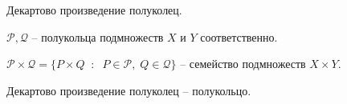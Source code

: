 
\begin{definition}\thmslashn
	
	Декартово произведение полуколец.
	
	$\mathcal{P}, \mathcal{Q}$ -- полукольца подмножеств $X$ и $Y$ соответственно.
	
	
	$\mathcal{P} \times \mathcal{Q} = \{P\times Q \;\;:\;\; P \in \mathcal{P}, \; Q\in\mathcal{Q} \}$ -- семейство подмножеств $X\times Y$.
\end{definition}

\begin{theorem}\thmslashn
	
	Декартово произведение полуколец -- полукольцо.
\end{theorem}

